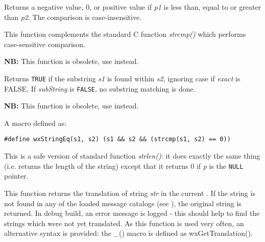 Returns a negative value, 0, or positive value if {\it p1} is less than, equal
to or greater than {\it p2}. The comparison is case-insensitive.

This function complements the standard C function {\it strcmp()} which performs
case-sensitive comparison.

\label{wxstringmatch}


{\bf NB:} This function is obsolete, use  instead.

Returns {\tt TRUE} if the substring {\it s1} is found within {\it s2},
ignoring case if {\it exact} is FALSE. If {\it subString} is {\tt FALSE},
no substring matching is done.

\label{wxstringeq}


{\bf NB:} This function is obsolete, use  instead.

A macro defined as:

\begin{verbatim}
#define wxStringEq(s1, s2) (s1 && s2 && (strcmp(s1, s2) == 0))
\end{verbatim}

\label{wxstrlen}


This is a safe version of standard function {\it strlen()}: it does exactly the
same thing (i.e. returns the length of the string) except that it returns 0 if
{\it p} is the {\tt NULL} pointer.

\label{wxgettranslation}


This function returns the translation of string {\it str} in the current
. If the string is not found in any of the loaded
message catalogs (see ), the
original string is returned. In debug build, an error message is logged - this
should help to find the strings which were not yet translated. As this function
is used very often, an alternative syntax is provided: the \_() macro is
defined as wxGetTranslation().

